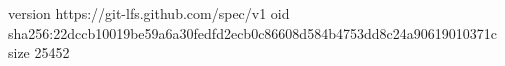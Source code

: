 version https://git-lfs.github.com/spec/v1
oid sha256:22dccb10019be59a6a30fedfd2ecb0c86608d584b4753dd8c24a90619010371c
size 25452
